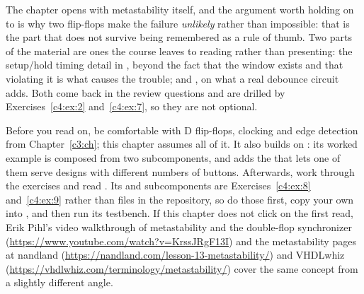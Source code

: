 The chapter opens with metastability itself, and the argument worth holding on to is why two
flip-flops make the failure \emph{unlikely} rather than impossible: that is the part that does not
survive being remembered as a rule of thumb. Two parts of the material are ones the course leaves
to reading rather than presenting: the setup/hold timing detail in , beyond the fact
that the window exists and that violating it is what causes the trouble; and , on
what a real debounce circuit adds. Both come back in the review questions and are drilled by
Exercises~\ref{c4:ex:2} and~\ref{c4:ex:7}, so they are not optional.

Before you read on, be comfortable with D flip-flops, clocking and edge detection from
Chapter~\ref{c3:ch}; this chapter assumes all of it. It also builds on : its worked
example is composed from two subcomponents, and  adds the  that lets one
of them serve designs with different numbers of buttons. Afterwards, work through the exercises and
read . Its  and
 subcomponents are Exercises~\ref{c4:ex:8} and~\ref{c4:ex:9} rather than files in
the repository, so do those first, copy your own into , and then run its
testbench. If this chapter does not click on the first read, Erik Pihl's video walkthrough of
metastability and the double-flop synchronizer (\url{https://www.youtube.com/watch?v=KrssJRgF13I})
and the metastability pages at nandland (\url{https://nandland.com/lesson-13-metastability/}) and
VHDLwhiz (\url{https://vhdlwhiz.com/terminology/metastability/}) cover the same concept from a
slightly different angle.




